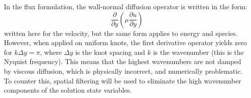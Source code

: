 %
%
%
%
%
%
%
%
%


In the flux formulation, the wall-normal diffusion operator is written
in the form:
\begin{equation}
\frac{\partial}{\partial y}\left(\mu\frac{\partial u}{\partial y}\right)
\end{equation}
written here for the velocity, but the same form applies to energy and
species. However, when applied on uniform knots, the first derivative
operator yields zero for $k\Delta y=\pi$, where $\Delta y$ is the knot
spacing and $k$ is the wavenumber (this is the Nyquist frequency). This
means that the highest wavenumbers are not damped by viscous diffusion,
which is physically incorrect, and numerically problematic. To counter
this, spatial filtering will be used to eliminate the high wavenumber
components of the solution state variables.

